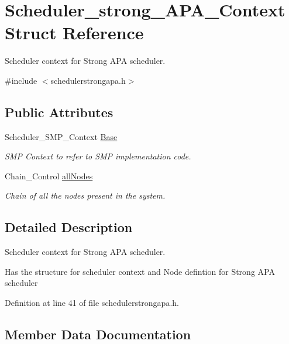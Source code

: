 \hypertarget{structScheduler__strong__APA__Context}{}\section{Scheduler\+\_\+strong\+\_\+\+A\+P\+A\+\_\+\+Context Struct Reference}
\label{structScheduler__strong__APA__Context}


Scheduler context for Strong A\+PA scheduler.  




{\ttfamily \#include $<$schedulerstrongapa.\+h$>$}

\subsection*{Public Attributes}
\begin{DoxyCompactItemize}
\item 
Scheduler\+\_\+\+S\+M\+P\+\_\+\+Context \hyperlink{structScheduler__strong__APA__Context_a55755b445b7e7beaf1b87b178521e615}{Base}
\begin{DoxyCompactList}\small\item\em S\+MP Context to refer to S\+MP implementation code. \end{DoxyCompactList}\item 
Chain\+\_\+\+Control \hyperlink{structScheduler__strong__APA__Context_ad850b98c29b7ab48bb7aff1a941fb331}{all\+Nodes}
\begin{DoxyCompactList}\small\item\em Chain of all the nodes present in the system. \end{DoxyCompactList}\end{DoxyCompactItemize}


\subsection{Detailed Description}
Scheduler context for Strong A\+PA scheduler. 

Has the structure for scheduler context and Node defintion for Strong A\+PA scheduler 

Definition at line 41 of file schedulerstrongapa.\+h.



\subsection{Member Data Documentation}
\mbox{\label{structScheduler__strong__APA__Context_ad850b98c29b7ab48bb7aff1a941fb331}} 
